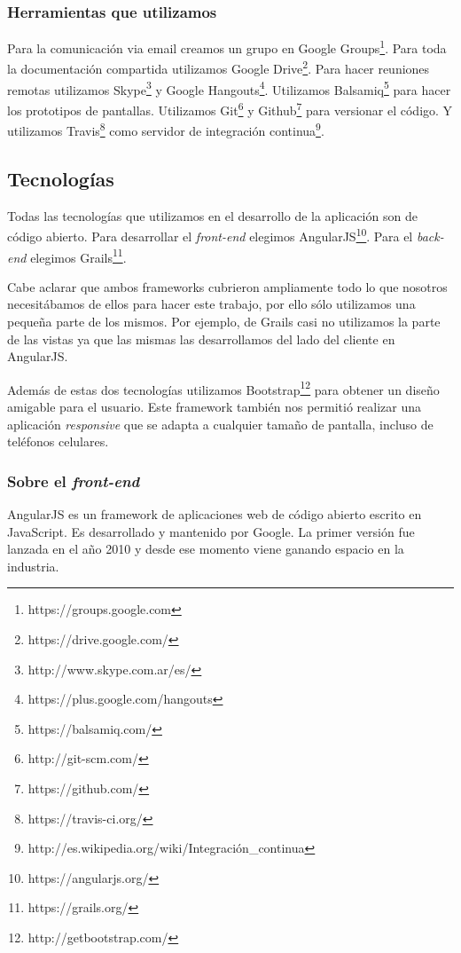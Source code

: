 \subsubsection{Herramientas que utilizamos}
Para la comunicación via email creamos un grupo en Google Groups\footnote{https://groups.google.com}.
Para toda la documentación compartida utilizamos Google Drive\footnote{https://drive.google.com/}. Para hacer reuniones remotas utilizamos Skype\footnote{http://www.skype.com.ar/es/} y Google Hangouts\footnote{https://plus.google.com/hangouts}. Utilizamos Balsamiq\footnote{https://balsamiq.com/} para hacer los prototipos de pantallas. Utilizamos Git\footnote{http://git-scm.com/} y Github\footnote{https://github.com/} para versionar el código. Y utilizamos Travis\footnote{https://travis-ci.org/} como servidor de integración continua\footnote{http://es.wikipedia.org/wiki/Integración\_continua}.

\subsection{Tecnologías}
Todas las tecnologías que utilizamos en el desarrollo de la aplicación son de código abierto. Para desarrollar el \textit{front-end} elegimos AngularJS\footnote{https://angularjs.org/}. Para el \textit{back-end} elegimos Grails\footnote{https://grails.org/}.

Cabe aclarar que ambos frameworks cubrieron ampliamente todo lo que nosotros necesitábamos de ellos para hacer este trabajo, por ello sólo utilizamos una pequeña parte de los mismos. Por ejemplo, de Grails casi no utilizamos la parte de las vistas ya que las mismas las desarrollamos del lado del cliente en AngularJS.

Además de estas dos tecnologías utilizamos Bootstrap\footnote{http://getbootstrap.com/} para obtener un diseño amigable para el usuario. Este framework también nos permitió realizar una aplicación \textit{responsive} que se adapta a cualquier tamaño de pantalla, incluso de teléfonos celulares.

\subsubsection{Sobre el \textit{front-end}}
AngularJS es un framework de aplicaciones web de código abierto escrito en JavaScript. Es desarrollado y mantenido por Google. La primer versión fue lanzada en el año 2010 y desde ese momento viene ganando espacio en la industria.

